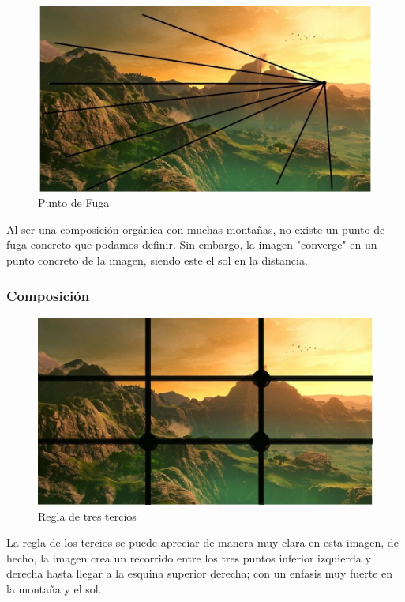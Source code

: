 \documentclass[12pt]{article}
\begin{document}
          \begin{figure}[H]
            \centering
            \includegraphics[scale = 0.45]{Jesus/Seccion16/Fondo1.JPEG}
            \caption{Punto de Fuga}
          \end{figure}
          Al ser una composición orgánica con muchas montañas, no existe un punto de fuga concreto que podamos definir. Sin embargo, la imagen "converge" en un punto concreto de la imagen, siendo este el sol en la distancia. 


        \subsubsection{Composición}
          \begin{figure}[H]
            \centering
            \includegraphics[scale = 0.5]{Jesus/Seccion16/Fondo3.JPEG}
            \caption{Regla de tres tercios}
          \end{figure}

          La regla de los tercios se puede apreciar de manera muy clara en esta imagen, de hecho, la imagen crea un recorrido entre los tres puntos inferior izquierda y derecha hasta llegar a la esquina superior derecha; con un enfasis muy fuerte en la montaña y el sol.
\end{document}
